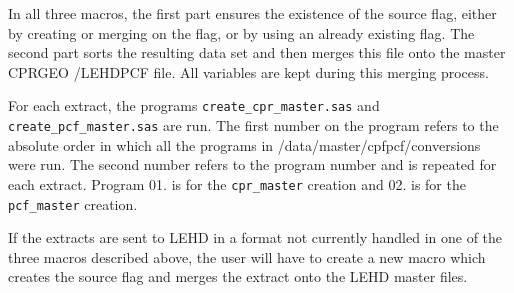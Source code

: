 In all three macros, the first part ensures the existence of the source
flag, either by creating or merging on the flag, or by using an already
existing flag.  The second part sorts the resulting data set and then
merges this file onto the master CPRGEO /LEHDPCF file.  All variables are
kept during this merging process.

For each extract, the programs \texttt{create\_cpr\_master.sas} and
\texttt{create\_pcf\_master.sas} are run.  The first number on the program refers to
the absolute order in which all the programs in
/data/master/cpfpcf/conversions were run.  The second number refers to the
program number and is repeated for each extract.  Program 01. is for the
\texttt{cpr\_master} creation and 02. is for the \texttt{pcf\_master} creation.

If the extracts are sent to LEHD in a format not currently handled in one
of the three macros described above, the user will have to create a new
macro which creates the source flag and merges the extract onto the LEHD
master files.




